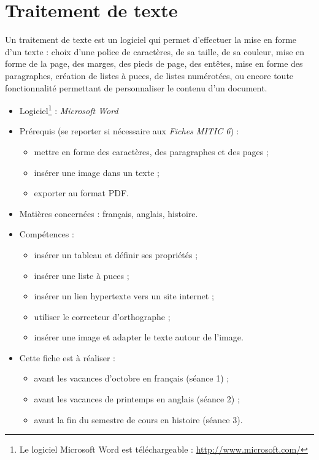 \chapter{Traitement de texte}  

Un traitement de texte est un logiciel qui permet d'effectuer la mise en forme d'un texte : choix d'une police de caractères, de sa taille, de sa couleur, mise en forme de la page, des marges, des pieds de page, des entêtes, mise en forme des paragraphes, création de listes à puces, de listes numérotées, ou encore toute fonctionnalité permettant de personnaliser le contenu d'un document.\\

{\footnotesize
\begin{itemize}
\item Logiciel\footnote{Le logiciel Microsoft Word est téléchargeable : \url{http://www.microsoft.com/}} : \emph{Microsoft Word} 
\item Prérequis (se reporter si nécessaire aux \emph{Fiches MITIC 6}) : 
        \begin{itemize}
        \item mettre en forme des caractères, des paragraphes et des pages ;
        \item insérer une image dans un texte ;
        \item exporter au format PDF.
        \end{itemize}
\item Matières concernées : français, anglais, histoire.
\item Compétences : 
        \begin{itemize}
        \item insérer un tableau et définir ses propriétés ;
        \item insérer une liste à puces ;
        \item insérer un lien hypertexte vers un site internet ;
        \item utiliser le correcteur d'orthographe ;
        \item insérer une image et adapter le texte autour de l'image.
        \end{itemize}
\item Cette fiche est à réaliser :
        \begin{itemize}
        \item avant les vacances d'octobre en français (séance 1) ;
        \item avant les vacances de printemps en anglais (séance 2) ;
        \item avant la fin du semestre de cours en histoire (séance 3). 
        \end{itemize}
\end{itemize}
}%


